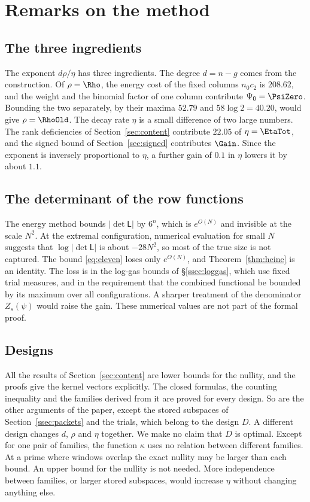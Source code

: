 \section{Remarks on the method}\label{sec:remarks}

\subsection{The three ingredients}
The exponent $d\rho/\eta$ has three ingredients. The degree $d=n-g$ comes from the construction. Of
$\rho=\Rho$, the energy cost of the fixed columns $n_0c_2$ is $208.62$, and the weight and the binomial factor
of one column contribute $\Psi_0=\PsiZero$. Bounding the two separately, by their maxima $52.79$ and
$58\log2=40.20$, would give $\rho=\RhoOld$. The decay rate $\eta$ is a small difference of two large numbers.
The rank deficiencies of Section~\ref{sec:content} contribute $22.05$ of $\eta=\EtaTot$, and the signed bound
of Section~\ref{sec:signed} contributes $\Gain$. Since the exponent is inversely proportional to $\eta$, a further
gain of $0.1$ in $\eta$ lowers it by about $1.1$.

\subsection{The determinant of the row functions}
The energy method bounds $|\det\mathsf L|$ by $6^n$, which is $e^{O(N)}$ and invisible at the scale $N^2$. At
the extremal configuration, numerical evaluation for small $N$ suggests that $\log|\det\mathsf L|$ is about
$-28N^2$, so most of the true size is not captured. The bound \eqref{eq:eleven} loses only $e^{O(N)}$, and
Theorem~\ref{thm:heine} is an identity. The loss is in the log-gas bounds of \S\ref{ssec:loggas}, which use fixed
trial measures, and in the requirement that the combined functional be bounded by its maximum over all
configurations. A sharper treatment of the denominator $Z_s(\psi)$ would raise the gain. These numerical values
are not part of the formal proof.

\subsection{Designs}
All the results of Section~\ref{sec:content} are lower bounds for the nullity, and the proofs give the kernel
vectors explicitly. The closed formulas, the counting inequality and the families derived from it are proved
for every design. So are the other arguments of the paper, except the stored subspaces of
Section~\ref{ssec:packets} and the trials, which belong to the design $D$. A different design changes $d$,
$\rho$ and $\eta$ together. We make no claim that $D$ is optimal. Except for one pair of families, the function
$\kappa$ uses no relation between different families. At a prime where windows overlap the exact nullity may
be larger than each bound. An upper bound for the nullity is not needed. More independence between families,
or larger stored subspaces, would increase $\eta$ without changing anything else.

